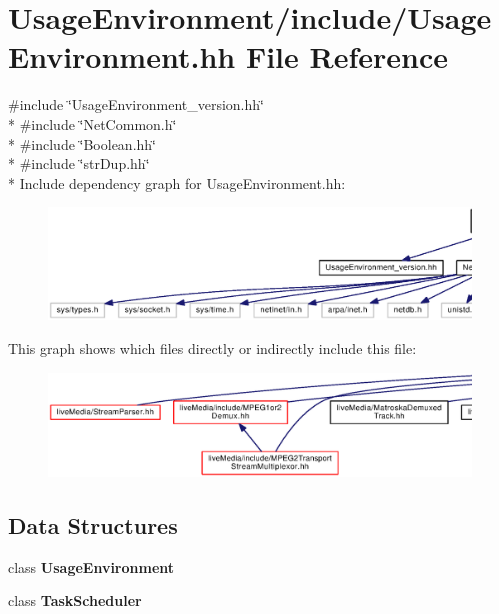 \section{Usage\+Environment/include/\+Usage\+Environment.hh File Reference}
\label{UsageEnvironment_8hh}
{\ttfamily \#include \char`\"{}Usage\+Environment\+\_\+version.\+hh\char`\"{}}\\*
{\ttfamily \#include \char`\"{}Net\+Common.\+h\char`\"{}}\\*
{\ttfamily \#include \char`\"{}Boolean.\+hh\char`\"{}}\\*
{\ttfamily \#include \char`\"{}str\+Dup.\+hh\char`\"{}}\\*
Include dependency graph for Usage\+Environment.\+hh\+:
\nopagebreak
\begin{figure}[H]
\begin{center}
\leavevmode
\includegraphics[width=350pt]{UsageEnvironment_8hh__incl}
\end{center}
\end{figure}
This graph shows which files directly or indirectly include this file\+:
\nopagebreak
\begin{figure}[H]
\begin{center}
\leavevmode
\includegraphics[width=350pt]{UsageEnvironment_8hh__dep__incl}
\end{center}
\end{figure}
\subsection*{Data Structures}
\begin{DoxyCompactItemize}
\item 
class {\bf Usage\+Environment}
\item 
class {\bf Task\+Scheduler}
\end{DoxyCompactItemize}
